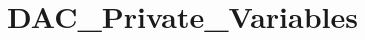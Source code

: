 \hypertarget{group___d_a_c___private___variables}{}\section{D\+A\+C\+\_\+\+Private\+\_\+\+Variables}
\label{group___d_a_c___private___variables}
